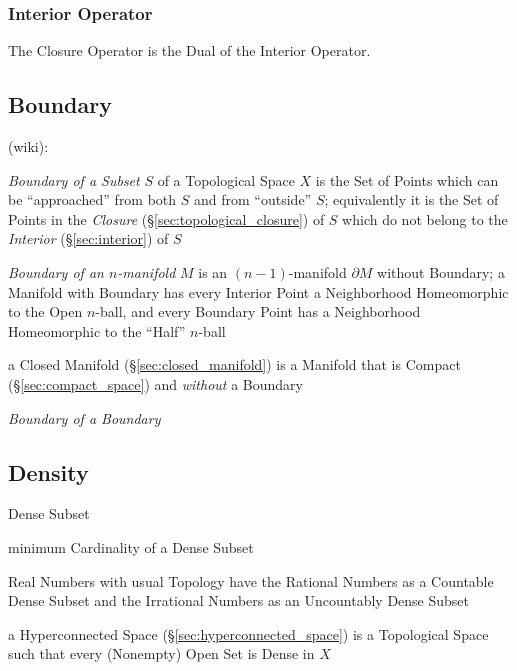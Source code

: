 \subsubsection{Interior Operator}\label{sec:interior_operator}

The Closure Operator is the Dual of the Interior Operator.



\subsection{Boundary}\label{sec:boundary}

(wiki):

\emph{Boundary of a Subset} $S$ of a Topological Space $X$ is the Set of Points
which can be ``approached'' from both $S$ and from ``outside'' $S$; equivalently
it is the Set of Points in the \emph{Closure} (\S\ref{sec:topological_closure})
of $S$ which do not belong to the \emph{Interior} (\S\ref{sec:interior}) of $S$

\emph{Boundary of an $n$-manifold} $M$ is an $(n-1)$-manifold $\partial M$
without Boundary; a Manifold with Boundary has every Interior Point a
Neighborhood Homeomorphic to the Open $n$-ball, and every Boundary Point has a
Neighborhood Homeomorphic to the ``Half'' $n$-ball

\fist a Closed Manifold (\S\ref{sec:closed_manifold}) is a Manifold that is
Compact (\S\ref{sec:compact_space}) and \emph{without} a Boundary

\emph{Boundary of a Boundary}



\subsection{Density}\label{sec:density}

Dense Subset

minimum Cardinality of a Dense Subset

Real Numbers with usual Topology have the Rational Numbers as a Countable Dense
Subset and the Irrational Numbers as an Uncountably Dense Subset

\fist a Hyperconnected Space (\S\ref{sec:hyperconnected_space}) is a
Topological Space such that every (Nonempty) Open Set is Dense in $X$

